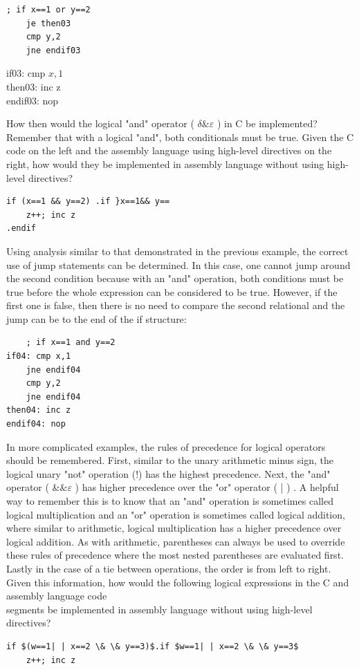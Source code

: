 \documentclass[10pt]{book}
\begin{document}
\begin{verbatim}
; if x==1 or y==2
    je then03
    cmp y,2
    jne endif03
\end{verbatim}

if03: cmp $x, 1$\\
then03: inc z\\
endif03: nop

How then would the logical "and" operator ( $\delta \& \varepsilon$ ) in C be implemented? Remember that with a logical "and", both conditionals must be true. Given the C code on the left and the assembly language using high-level directives on the right, how would they be implemented in assembly language without using high-level directives?
\begin{verbatim}
if (x==1 && y==2) .if }x==1&& y==
    z++; inc z
.endif
\end{verbatim}

Using analysis similar to that demonstrated in the previous example, the correct use of jump statements can be determined. In this case, one cannot jump around the second condition because with an "and" operation, both conditions must be true before the whole expression can be considered to be true. However, if the first one is false, then there is no need to compare the second relational and the jump can be to the end of the if structure:

\begin{verbatim}
    ; if x==1 and y==2
if04: cmp x,1
    jne endif04
    cmp y,2
    jne endif04
then04: inc z
endif04: nop
\end{verbatim}

In more complicated examples, the rules of precedence for logical operators should be remembered. First, similar to the unary arithmetic minus sign, the logical unary "not" operation (!) has the highest precedence. Next, the "and" operator ( $\& \& \varepsilon$ ) has higher precedence over the "or" operator ( | ) . A helpful way to remember this is to know that an "and" operation is sometimes called logical multiplication and an "or" operation is sometimes called logical addition, where similar to arithmetic, logical multiplication has a higher precedence over logical addition. As with arithmetic, parentheses can always be used to override these rules of precedence where the most nested parentheses are evaluated first. Lastly in the case of a tie between operations, the order is from left to right. Given this information, how would the following logical expressions in the C and assembly language code\\
segments be implemented in assembly language without using high-level directives?
\begin{verbatim}
if $(w==1| | x==2 \& \& y==3)$.if $w==1| | x==2 \& \& y==3$
    z++; inc z
\end{verbatim}
\end{document}
